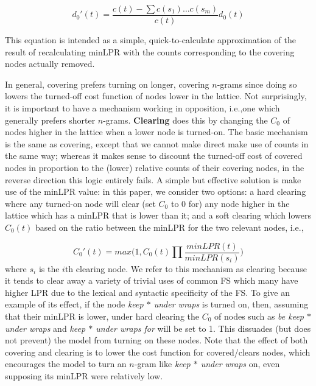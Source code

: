 \documentclass[11pt]{article}
\makeatletter
\def \ie {i.e.,\@ }
\newcommand{\gap}{$*$\xspace}
\newcommand{\ex}[1]{\textit{#1}\xspace}
\newcommand{\termdef}[1]{\textbf{#1}\xspace}
\makeatother
\begin{document}
\begin{displaymath}
d_{0}'(t) = \frac{c(t) - \sum{c(s_1)\ldots c(s_m)}}{c(t)} d_0(t)
\end{displaymath}

\noindent
This equation is intended as a simple, quick-to-calculate approximation of the result of recalculating minLPR with the counts corresponding to the covering nodes actually removed.

In general, covering prefers turning on longer, covering $n$-grams since doing so lowers the turned-off cost function of nodes lower in the lattice. Not surprisingly, it is important to have a mechanism working in opposition, \ie one which generally prefers shorter $n$-grams. \termdef{Clearing} does this by changing the $C_0$ of nodes higher in the lattice when a lower node is turned-on. The basic mechanism is the same as covering, except that we cannot make direct make use of counts in the same way; whereas it makes sense to discount the turned-off cost of covered nodes in proportion to the (lower) relative counts of their covering nodes, in the reverse direction this logic entirely fails. A simple but effective solution is make use of the minLPR value: in this paper, we consider two options: a hard clearing where any turned-on node will clear (set $C_{0}$ to 0 for) any node higher in the lattice which has a minLPR that is lower than it; and a soft clearing which lowers  $C_{0}(t)$ based on the ratio between the minLPR for the two relevant nodes, \ie

\begin{displaymath}
C_{0}'(t) = max(1, C_{0}(t) \prod{\frac{minLPR(t)}{minLPR(s_i)})}
\end{displaymath}
where $s_i$ is the $i$th clearing node. We refer to this mechanism as clearing because it tends to clear away a variety of trivial uses of common FS which many have higher LPR due to the lexical and syntactic specificity of the FS. To give an example of its effect, if the node \ex{keep \gap under wraps} is turned on, then, assuming that their minLPR is lower, under hard clearing the $C_0$ of nodes such as \ex{be keep \gap under wraps} and \ex{keep \gap under wraps for} will be set to 1. This dissuades (but does not prevent) the model from turning on these nodes. Note that the effect of both covering and clearing is to lower the cost function for covered/clears nodes, which encourages the model to turn an $n$-gram like \ex{keep \gap under wraps} on, even supposing its minLPR were relatively low.
\end{document}
